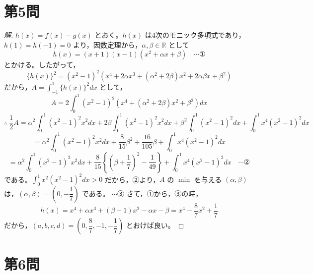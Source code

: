 \documentclass[../main.tex]{subfiles}
\begin{document}
\newpage

\section*{第5問}

\begin{proof}[解]
  $h(x)=f(x)-g(x)$ とおく。$h(x)$ は4次のモニック多項式であり，$h(1)=h(-1)=0$ より，因数定理から，$\alpha,\beta\in\mathbb{R}$ として
  \[
    h(x)=(x+1)(x-1)(x^2+\alpha x+\beta) \quad \cdots \text{①}
  \]
  とかける。したがって，
  \[
    \{h(x)\}^2=(x^2-1)^2(x^4+2\alpha x^3+(\alpha^2+2\beta)x^2+2\alpha\beta x+\beta^2)
  \]
  だから，$A=\displaystyle\int_{-1}^1\{h(x)\}^2dx$ として，
  \[
    A=2\int_0^1(x^2-1)^2(x^4+(\alpha^2+2\beta)x^2+\beta^2)dx
  \]
  \[
    \therefore\ \frac12A=\alpha^2\int_0^1(x^2-1)^2x^2dx+2\beta\int_0^1(x^2-1)^2x^2dx+\beta^2\int_0^1(x^2-1)^2dx+\int_0^1x^4(x^2-1)^2dx
  \]
  \[
    =\alpha^2\int_0^1(x^2-1)^2x^2dx+\frac{8}{15}\beta^2+\frac{16}{105}\beta+\int_0^1x^4(x^2-1)^2dx
  \]
  \[
    =\alpha^2\int_0^1(x^2-1)^2x^2dx+\frac{8}{15}\left\{\left(\beta+\frac17\right)^2-\frac{1}{49}\right\}+\int_0^1x^4(x^2-1)^2dx \quad \cdots \text{②}
  \]
  である。$\displaystyle\int_0^1x^2(x^2-1)^2dx>0$ だから，②より，$A$ の $\min$ を与える $(\alpha,\beta)$ は，$(\alpha,\beta)=\left(0,-\dfrac17\right)$ である。 $\cdots$③ さて，①から，③の時，
  \[
    h(x)=x^4+\alpha x^3+(\beta-1)x^2-\alpha x-\beta = x^4-\frac{8}{7}x^2+\frac17
  \]
  だから，$(a,b,c,d)=\left(0,\dfrac{8}{7},-1,-\dfrac17\right)$ とおけば良い。
\end{proof}

\newpage

\section*{第6問}
\end{document}
